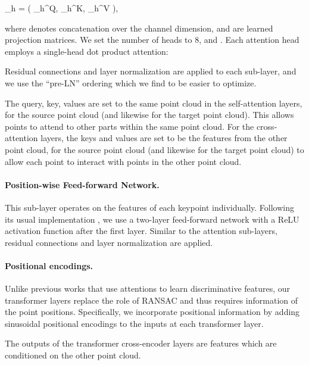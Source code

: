 \documentclass[10pt,twocolumn,letterpaper]{article}
\begin{document}
    _{h} = \left(
    _h^Q, _h^K, _h^V
    \right),

where  denotes concatenation over the channel dimension,  and  are learned projection matrices. We set the number of heads  to 8, and . Each attention head employs a single-head dot product attention:

Residual connections and layer normalization are applied to each sub-layer, and we use the ``pre-LN'' \cite{xiong2020prenorm} ordering which we find to be easier to optimize.

The query, key, values are set to the same point cloud in the self-attention layers, \ie  for the source point cloud (and likewise for the target point cloud). This allows points to attend to other parts within the same point cloud.
For the cross-attention layers, the keys and values are set to be the features from the other point cloud, \ie  for the source point cloud (and likewise for the target point cloud) to allow each point to interact with points in the other point cloud.

\vspace{-4mm}
\paragraph{Position-wise Feed-forward Network.} 
This sub-layer operates on the features of each keypoint individually. Following its usual implementation \cite{vaswani2017attention}, we use a two-layer feed-forward network with a ReLU activation function after the first layer. Similar to the attention sub-layers, residual connections and layer normalization are applied.

\vspace{-4mm}
\paragraph{Positional encodings.} Unlike previous works \cite{huang2021predator,wang2019dcp} that use attentions to learn discriminative features, our transformer layers replace the role of RANSAC and thus requires information of the point positions.
Specifically, we incorporate positional information by adding sinusoidal positional encodings \cite{vaswani2017attention} to the inputs at each transformer layer.

\medskip
The outputs of the transformer cross-encoder layers are features  which are conditioned on the other point cloud.
\end{document}

